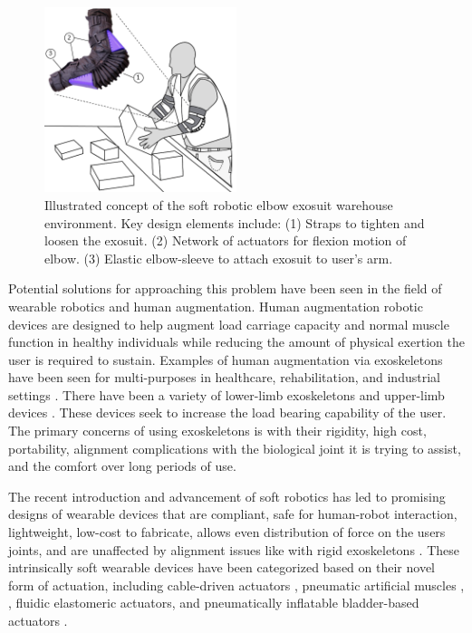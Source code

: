 \documentclass[letterpaper, 10 pt, conference]{ieeeconf}  %
\begin{document}
\begin{figure}[t!]
\centering
\includegraphics[width=0.5\textwidth]{Concept.PNG}
\caption{Illustrated concept of the soft robotic elbow exosuit warehouse environment. Key design elements include: (1) Straps to tighten and loosen the exosuit. (2) Network of actuators for flexion motion of elbow.  (3) Elastic elbow-sleeve to attach exosuit to user’s arm.}
\label{fig:concept}
\vspace{-1.5em}
\end{figure}

Potential solutions for approaching this problem have been seen in the field of wearable robotics and human augmentation. Human augmentation robotic devices are designed to help augment load carriage capacity and normal muscle function in healthy individuals while reducing the amount of physical exertion the user is required to sustain. Examples of human augmentation via exoskeletons have been seen for multi-purposes in healthcare, rehabilitation, and industrial settings \cite{Kazerooni2008}. There have been a variety of lower-limb exoskeletons \cite{Viteckova2013} and upper-limb devices \cite{Gopura2016a}. These devices seek to increase the load bearing capability of the user. The primary concerns of using exoskeletons is with their rigidity, high cost, portability, alignment complications with the biological joint it is trying to assist, and the comfort over long periods of use.

The recent introduction and advancement of soft robotics has led to promising designs of wearable devices that are compliant, safe for human-robot interaction, lightweight, low-cost to fabricate, allows even distribution of force on the users joints, and are unaffected by alignment issues like with rigid exoskeletons \cite{ADEM:ADEM201700016}. These intrinsically soft wearable devices have been categorized based on their novel form of actuation, including cable-driven actuators \cite{Gopura2016a} \cite{Dinh2017} \cite{Xiloyannis2017} \cite{Ding2016}, pneumatic artificial muscles \cite{Park2014cd},\cite{CALDWELL2007a} \cite{Al-fahaam2017}, fluidic elastomeric actuators\cite{Polygerinos,Koh2017,Chen2017h}, and pneumatically inflatable bladder-based actuators \cite{Kim2017,Sridar2017,Simpson2017,Koh2017}.
\end{document}
